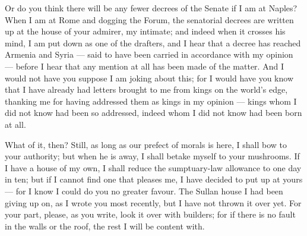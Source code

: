 Or do you think there will be any fewer decrees of the Senate if I am at Naples? When I am at Rome and dogging the Forum, the senatorial decrees are written up at the house of your admirer, my intimate; and indeed when it crosses his mind, I am put down as one of the drafters, and I hear that a decree has reached Armenia and Syria --- said to have been carried in accordance with my opinion --- before I hear that any mention at all has been made of the matter. And I would not have you suppose I am joking about this; for I would have you know that I have already had letters brought to me from kings on the world's edge, thanking me for having addressed them as kings in my opinion --- kings whom I did not know had been so addressed, indeed whom I did not know had been born at all.

 What of it, then? Still, as long as our prefect of morals is here, I shall bow to your authority; but when he is away, I shall betake myself to your mushrooms. If I have a house of my own, I shall reduce the sumptuary-law allowance to one day in ten; but if I cannot find one that pleases me, I have decided to put up at yours --- for I know I could do you no greater favour. The Sullan house I had been giving up on, as I wrote you most recently, but I have not thrown it over yet. For your part, please, as you write, look it over with builders; for if there is no fault in the walls or the roof, the rest I will be content with.
